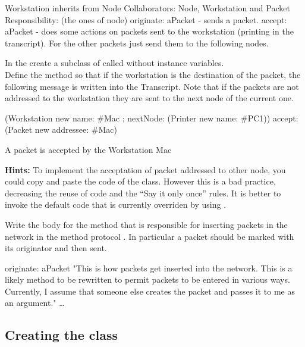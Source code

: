 \begin{code}
Workstation inherits from Node
Collaborators: Node, Workstation
and Packet
Responsibility: (the ones of node)
originate: aPacket - sends a packet.
accept: aPacket - does some actions on packets sent to the
workstation (printing in the transcript). For the other 
packets just send them to the following nodes.
\end{code}

\exercise In the \category {} create a subclass of
called  without instance
variables. \\

\exercise  Define the method  so that if
the workstation is the destination of the packet, the following
message is written into the Transcript. Note that if the packets
are not addressed to the workstation they are sent to the next
node of the current one.

\begin{code}
(Workstation new 
    name: \#Mac ; 
    nextNode: (Printer new name: \#PC1))
          accept: (Packet new addressee: \#Mac)
          
A packet is accepted by the Workstation Mac
\end{code}

\textbf{Hints:} To implement the acceptation of packet addressed
to other node, you could copy and paste the code of the
 class. However this is a bad practice, decreasing
the reuse of code and the ``Say it only once'' rules. It is better
to invoke the default code that is currently overriden by using
. 

\exercise  Write the body for the method  that
is responsible for inserting packets in the network in the method
protocol . In particular a packet should be
marked with its originator and then sent.

\begin{code}
originate: aPacket
 "This is how packets get inserted into the network.
  This is a likely method to be rewritten to permit 
  packets to be entered in various ways. Currently, 
  I assume that someone else creates the packet and 
  passes it to me as an argument."
 \ldots

\end{code}

\subsection*{Creating the class }

